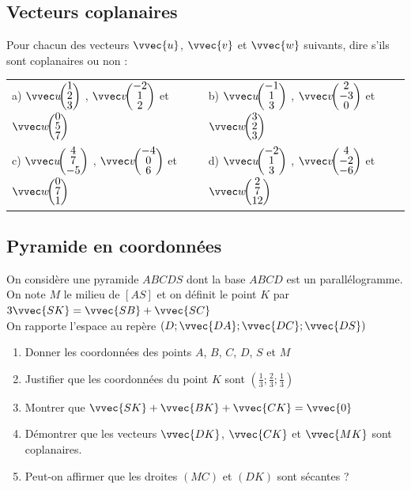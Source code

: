 \documentclass[oneside,12pt]{book}          %
\begin{document}
    
\subsection{Vecteurs coplanaires}
Pour chacun des vecteurs $\vvec{u}$, $\vvec{v}$ et $\vvec{w}$ suivants, dire s'ils sont coplanaires ou non :

\begin{tabular}{p{} p{}}
    a) $\vcoord{u}{1\\2\\3}$ , $\vcoord{v}{-2\\1\\2}$ et $\vcoord{w}{0\\5\\7}$ &
    b) $\vcoord{u}{-1\\1\\3}$ , $\vcoord{v}{2\\-3\\0}$ et $\vcoord{w}{3\\2\\3}$ \\[20pt]
    c) $\vcoord{u}{4\\7\\-5}$ , $\vcoord{v}{-4\\0\\6}$ et $\vcoord{w}{0\\7\\1}$ &
    d) $\vcoord{u}{-2\\1\\3}$ , $\vcoord{v}{4\\-2\\-6}$ et $\vcoord{w}{2\\7\\12}$ \\
\end{tabular}



\subsection{Pyramide en coordonnées}
On considère une pyramide $ABCDS$ dont la base $ABCD$ est un parallélogramme. On note $M$ le milieu de $[AS]$ et on définit le point $K$ par $3\vvec{SK}=\vvec{SB}+\vvec{SC}$\\
On rapporte l'espace au repère $(D;\vvec{DA};\vvec{DC};\vvec{DS})$
\begin{enumerate}
	\item Donner les coordonnées des points $A$, $B$, $C$, $D$, $S$ et $M$
	\item Justifier que les coordonnées du point $K$ sont $\left(\frac{1}{3};\frac{2}{3};\frac{1}{3}\right)$
	\item Montrer que $\vvec{SK}+\vvec{BK}+\vvec{CK}=\vvec{0}$
	\item Démontrer que les vecteurs $\vvec{DK}$, $\vvec{CK}$ et $\vvec{MK}$ sont coplanaires.
	\item Peut-on affirmer que les droites $(MC)$  et $(DK)$ sont sécantes ?
\end{enumerate}
\end{document}
